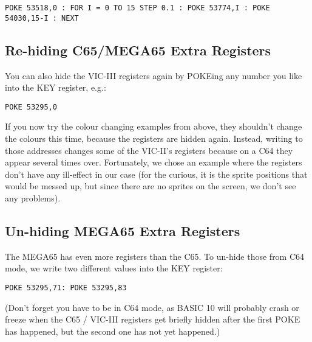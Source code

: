 \begin{tcolorbox}[colback=black,coltext=white]
\verbatimfont{\codefont}
\begin{verbatim}
POKE 53518,0 : FOR I = 0 TO 15 STEP 0.1 : POKE 53774,I : POKE 54030,15-I : NEXT
\end{verbatim}
\end{tcolorbox}

\subsection{Re-hiding C65/MEGA65 Extra Registers}

You can also hide the VIC-III registers again by POKEing any number you like into the KEY register, e.g.:

\begin{tcolorbox}[colback=black,coltext=white]
\verbatimfont{\codefont}
\begin{verbatim}
POKE 53295,0
\end{verbatim}
\end{tcolorbox}

If you now try the colour changing examples from above, they shouldn't change the colours this time, because
the registers are hidden again. Instead, writing to those addresses changes some of the VIC-II's registers
because on a C64 they appear several times over.  Fortunately, we chose an example where the registers don't
have any ill-effect in our case (for the curious, it is the sprite positions that would be messed up, but
since there are no sprites on the screen, we don't see any problems).

\subsection{Un-hiding MEGA65 Extra Registers}

The MEGA65 has even more registers than the C65.  To un-hide those from C64 mode, we write two different values into the KEY register:

\begin{tcolorbox}[colback=black,coltext=white]
\verbatimfont{\codefont}
\begin{verbatim}
POKE 53295,71: POKE 53295,83
\end{verbatim}
\end{tcolorbox}

(Don't forget you have to be in C64 mode, as BASIC 10 will probably crash or freeze when the C65 / VIC-III registers get briefly
hidden after the first POKE has happened, but the second one has not yet happened.)

